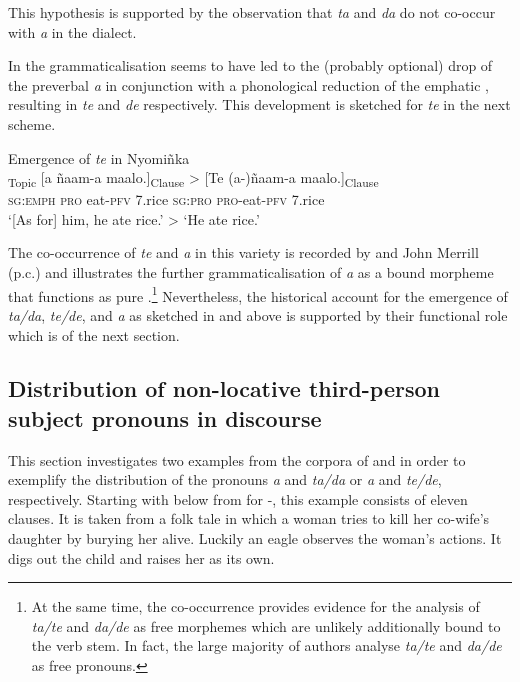 \documentclass[output=paper,newtxmath,modfonts,nonflat,hidelinks]{langsci/langscibook}
\begin{document}
This hypothesis is supported by the observation that \textit{ta} and \textit{da} do not co-occur with \textit{a} in the  dialect.

In   the grammaticalisation seems to have led to the (probably optional) drop of the preverbal \textit{a} in conjunction with a phonological reduction of the emphatic , resulting in \textit{te} and \textit{de} respectively. This development is sketched for \textit{te} in the next scheme.

\ea\label{ex:apel:15}
{Emergence of \textit{te} in  Nyomiñka}\\
\gll   [Ten]\textsubscript{Topic} [a ñaam-a maalo.]\textsubscript{Clause} > [Te (a-)ñaam-a maalo.]\textsubscript{Clause}\\
     \textsc{sg:emph} \textsc{pro} eat\textsc{-pfv} \textsc{7.}rice {} \textsc{sg:pro} \textsc{pro-}eat\textsc{-pfv} \textsc{7.}rice\\
\glt ‘[As for] him, he ate rice.’ > ‘He ate rice.’
\z

The co-occurrence of \textit{te} and \textit{a} in this variety is recorded by \citet{Renaudier2012} and John Merrill (p.c.) and illustrates the further grammaticalisation of \textit{a} as a bound morpheme that functions as pure .\footnote{At the same time, the co-occurrence provides evidence for the analysis of \textit{ta/te} and \textit{da/de} as free morphemes which are unlikely additionally bound to the verb stem. In fact, the large majority of authors analyse \textit{ta/te} and \textit{da/de} as free pronouns.} Nevertheless, the historical account for the emergence of \textit{ta/da}, \textit{te/de}, and \textit{a} as sketched in  and  above is supported by their functional role which is  of the next section. 

\subsection{Distribution of non-locative third-person subject pronouns in discourse}\label{sec:apel:2.3}

This section investigates two examples from the corpora of \citet{Faye1979} and \citet{Renaudier2012} in order to exemplify the distribution of the pronouns \textit{a} and \textit{ta/da} or \textit{a} and \textit{te/de}, respectively. Starting with  below from \citet{Faye1979} for -, this example consists of eleven clauses. It is taken from a folk tale in which a woman tries to kill her co-wife’s daughter by burying her alive. Luckily an eagle observes the woman’s actions. It digs out the child and raises her as its own.
\end{document}
